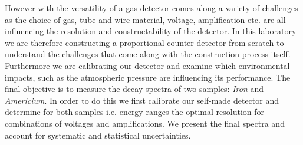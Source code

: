 However with the versatility of a gas detector comes along a variety of challenges
as the choice of gas, tube and wire material, voltage, amplification etc. are
all influencing the resolution and constructability of the detector. In this
laboratory we are therefore constructing a proportional counter detector from
scratch to understand the challenges that come along with the construction
process itself. Furthermore we are calibrating our detector and examine which
environmental impacts, such as the atmospheric pressure are influencing its
performance. The final objective is to measure the decay spectra of two samples:
\emph{Iron} and \emph{Americium}. In order to do this we first calibrate our self-made
detector and determine for both samples i.e. energy ranges the optimal
resolution for combinations of voltages and amplifications. We present the final
spectra and account for systematic and statistical uncertainties.